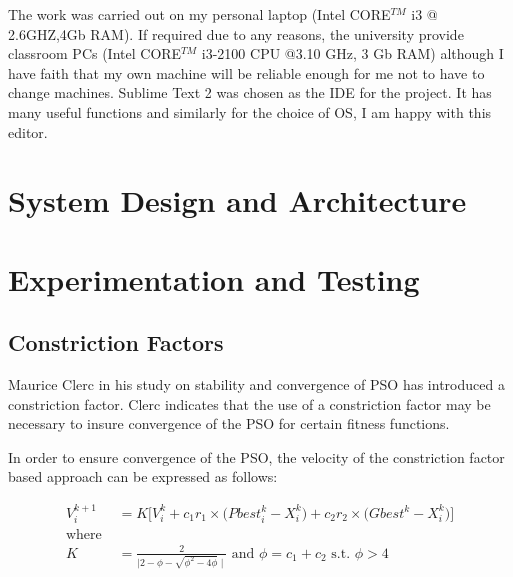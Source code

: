 \documentclass{pdfmx4020}
\begin{document}
      The work was carried out on my personal laptop (Intel CORE$^{TM}$ i3 @ 2.6GHZ,4Gb RAM). If required due to any reasons, the university provide classroom PCs (Intel CORE$^{TM}$ i3-2100 CPU @3.10 GHz, 3 Gb RAM) although I have faith that my own machine will be reliable enough for me not to have to change machines. 
      Sublime Text 2 was chosen as the IDE for the project. It has many useful functions \cite{sublime} and similarly for the choice of OS, I am happy with this editor.
  

\chapter{System Design and Architecture}


\chapter{Experimentation and Testing}

  \section{Constriction Factors} %
  \label{sec:constriction_factors}
    Maurice Clerc in his study on stability and convergence of PSO \cite{constriction_factor} has introduced a constriction factor. Clerc indicates that the use of a constriction factor may be necessary to insure convergence of the PSO for certain fitness functions.

    In order to ensure convergence of the PSO, the velocity of the constriction factor based approach can be expressed as follows:

    \begin{equation} \label{eq:cf}
      \begin{split}
        V_{i}^{k+1} & = K \Bigg[ V_{i}^{k} + c_1 r_1 \times \Big( Pbest_{i}^{k} - X_{i}^{k} \Big) + c_2 r_2 \times \Big( Gbest^{k} - X_{i}^{k} \Big) \Bigg] \\
        \text{where }\\
        K & = \frac{2}{\mid 2 - \phi - \sqrt{\phi^2 -4\phi} \mid} \text{ and } \phi = c_1 + c_2 \text{ s.t. } \phi > 4  \\
      \end{split}
    \end{equation}
\end{document}
